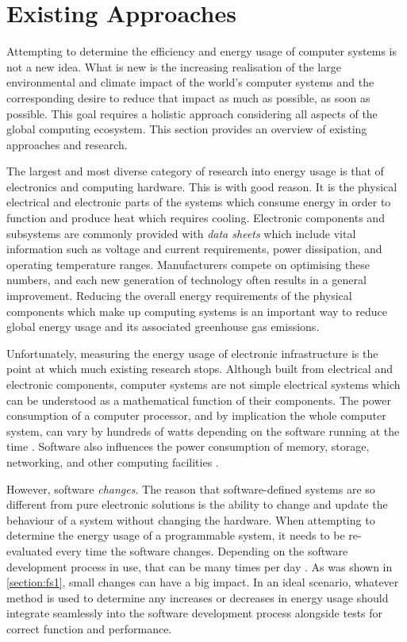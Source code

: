 \section{Existing Approaches}

Attempting to determine the efficiency and energy usage of computer systems is not a new idea. What is new is the increasing realisation of the large environmental and climate impact of the world's computer systems and the corresponding desire to reduce that impact as much as possible, as soon as possible. This goal requires a holistic approach considering all aspects of the global computing ecosystem. This section provides an overview of existing approaches and research.

The largest and most diverse category of research into energy usage is that of electronics and computing hardware. This is with good reason. It is the physical electrical and electronic parts of the systems which consume energy in order to function and produce heat which requires cooling. Electronic components and subsystems are commonly provided with \emph{data sheets} which include vital information such as voltage and current requirements, power dissipation, and operating temperature ranges. Manufacturers compete on optimising these numbers, and each new generation of technology often results in a general improvement. Reducing the overall energy requirements of the physical components which make up computing systems is an important way to reduce global energy usage and its associated greenhouse gas emissions.

Unfortunately, measuring the energy usage of electronic infrastructure is the point at which much existing research stops. Although built from electrical and electronic components, computer systems are not simple electrical systems which can be understood as a mathematical function of their components. The power consumption of a computer processor, and by implication the whole computer system, can vary by hundreds of watts depending on the software running at the time \citep{derBauer2023}. Software also influences the power consumption of memory, storage, networking, and other computing facilities \citep{Basmadjian2012}.

However, software \emph{changes}. The reason that software-defined systems are so different from pure electronic solutions is the ability to change and update the behaviour of a system without changing the hardware. When attempting to determine the energy usage of a programmable system, it needs to be re-evaluated every time the software changes. Depending on the software development process in use, that can be many times per day \citep{Shahin2017}. As was shown in \autoref{section:fs1}, small changes can have a big impact. In an ideal scenario, whatever method is used to determine any increases or decreases in energy usage should integrate seamlessly into the software development process alongside tests for correct function and performance.

